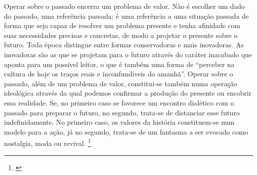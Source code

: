 








\begin{citacao}
Operar sobre o passado encerra um problema de valor. Não é escolher um dado do passado, uma referência passada; é uma referência a uma situação passada de forma que seja capaz de resolver um problema presente e tenha afinidade com suas necessidades precisas e concretas, de modo a projetar o presente sobre o futuro. Toda época distingue entre formas conservadoras e mais inovadoras. As inovadoras são as que se projetam para o futuro através do caráter inacabado que aponta para um possível leitor, o que é também uma forma de ``perceber na cultura de hoje os traços reais e inconfundíveis do amanhã''. Operar sobre o passado, além de um problema de valor, constitui-se também numa operação ideológica através da qual podemos confirmar a produção do presente ou encobrir essa realidade. Se, no primeiro caso se favorece um encontro dialético com o passado para preparar o futuro, no segundo, trata-se de distanciar esse futuro indefinidamente. No primeiro caso, os valores da história constituem-se num modelo para a ação, já no segundo, trata-se de um fantasma a ser evocado como nostalgia, moda ou revival. \footnote{\cite{JulioPlaza1969}}
\end{citacao}


